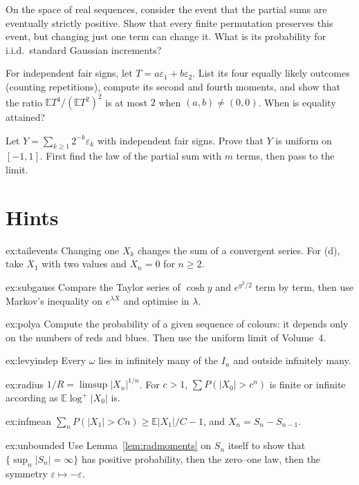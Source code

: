 \begin{exercise}[$\star$]\label{ex:v11-ch01-permute}
On the space of real sequences, consider the event that the partial sums are eventually strictly positive. Show that every finite permutation preserves this event, but changing just one term can change it. What is its probability for i.i.d.\ standard Gaussian increments?
\end{exercise}

\begin{exercise}[$\star\star$]\label{ex:v11-ch01-moment}
For independent fair signs, let $T=a\varepsilon_1+b\varepsilon_2$. List its four equally likely outcomes (counting repetitions), compute its second and fourth moments, and show that the ratio $\mathbb E T^4/(\mathbb E T^2)^2$ is at most $2$ when $(a,b)\ne(0,0)$. When is equality attained?
\end{exercise}

\begin{exercise}[$\star\star$]\label{ex:v11-ch01-dyadic}
Let $Y=\sum_{k\ge1}2^{-k}\varepsilon_k$ with independent fair signs. Prove that $Y$ is uniform on $[-1,1]$. First find the law of the partial sum with $m$ terms, then pass to the limit.
\end{exercise}

\section{Hints}

\begin{hint}{ex:tailevents}
Changing one $X_k$ changes the sum of a convergent series. For (d), take $X_1$ with two values and $X_n=0$ for $n\ge2$.
\end{hint}
\begin{hint}{ex:subgauss}
Compare the Taylor series of $\cosh y$ and $e^{y^2/2}$ term by term, then use Markov's inequality on $e^{\lambda X}$ and optimise in $\lambda$.
\end{hint}
\begin{hint}{ex:polya}
Compute the probability of a given sequence of colours: it depends only on the numbers of reds and blues. Then use the uniform limit of
Volume~4.
\end{hint}
\begin{hint}{ex:levyindep}
Every $\omega$ lies in infinitely many of the $I_n$ and outside infinitely many.
\end{hint}
\begin{hint}{ex:radius}
$1/R=\limsup|X_n|^{1/n}$. For $c>1$, $\sum P(|X_0|>c^n)$ is finite or infinite according as $\mathbb E\log^+|X_0|$ is.
\end{hint}
\begin{hint}{ex:infmean}
$\sum_nP(|X_1|>Cn)\ge\mathbb E|X_1|/C-1$, and $X_n=S_n-S_{n-1}$.
\end{hint}
\begin{hint}{ex:unbounded}
Use Lemma~\ref{lem:radmoments} on $S_n$ itself to show that $\{\sup_n|S_n|=\infty\}$ has positive probability, then the zero--one law, then
the symmetry $\varepsilon\mapsto-\varepsilon$.
\end{hint}


